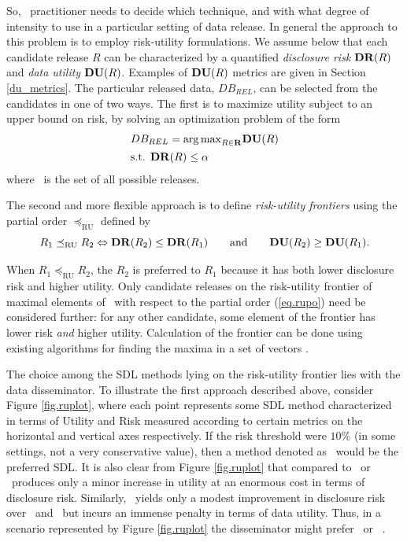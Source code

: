 \documentclass[12pt]{article}
\begin{document}
So,  \SDL\ practitioner needs to decide which technique, and with what
degree of intensity to use in a particular setting of data release. 
In general the approach to this problem is to employ risk-utility formulations. We assume
below that each candidate release $R$ can be characterized by a quantified
\textit{disclosure risk} $\mathbf{DR} (R)$ and \textit{data utility} $\mathbf{DU}
(R)$.  Examples of $\mathbf{DU}(R)$ metrics are given in Section \ref{du_metrics}.
The particular released data, $DB_{REL}$, can be selected from
the candidates in one of two ways. The first is to maximize
utility subject to an upper bound on risk, by solving an
optimization problem of the form
\begin{equation}\label{eq.opt}
\begin{array}{l}
DB_{REL} = {\arg\max}_{R \in \mathbf{R}} \mathbf{DU} (R) \\[1ex]
\mbox{s.t. } \mathbf{DR}(R) \leq \alpha
\end{array}
\end{equation}
where \RS\ is the set of all possible releases. 

The second and more flexible approach is to define \textit{risk-utility
frontiers} using the partial order $\preceq_{\mathrm{RU}}$ defined
by
\begin{equation}\label{eq.rupo}
R_1 \preceq_{\mathrm{RU}} R_2 \Leftrightarrow \mathbf{DR}(R_2) \leq
\mathbf{DR}(R_1) \qquad\mbox{and}\qquad \mathbf{DU}(R_2) \geq \mathbf{DU}(R_1).
\end{equation}

When $R_1 \preceq_{\mathrm{RU}} R_2$, the $R_2$ is preferred to
$R_1$ because it has both lower disclosure risk and higher
utility. Only candidate releases on the risk-utility frontier of
maximal elements of \RS\ with respect to the partial order
(\ref{eq.rupo}) need be considered further: for any other
candidate, some element of the frontier has lower risk
\textit{and} higher utility. Calculation of the frontier can be
done using existing algorithms for finding the maxima in a set of
vectors \citep{kung-luccio-preparata75}. 


The choice among the SDL methods lying on the risk-utility
frontier lies with the data disseminator. To illustrate the first approach
described above, consider Figure \ref{fig.ruplot}, where each point
represents some SDL method characterized in terms of Utility and Risk 
measured according to certain metrics on the horizontal and vertical axes respectively.
If the risk threshold were $10\%$ (in some settings, not a very conservative value), 
then a method denoted as \NOI\ would be the preferred SDL. It is also clear from Figure \ref{fig.ruplot} that compared to \MICZ\ or \NOI\, \MICI\ produces only a minor increase
in utility at an enormous cost in terms of disclosure risk. Similarly,
\RANK\ yields only a modest improvement in disclosure
risk over \MICP\ and \NOI\, but incurs an immense
penalty in terms of data utility. Thus, in a scenario represented by Figure \ref{fig.ruplot}
 the disseminator  might prefer \NOI\ or \MICP\ .
\end{document}
